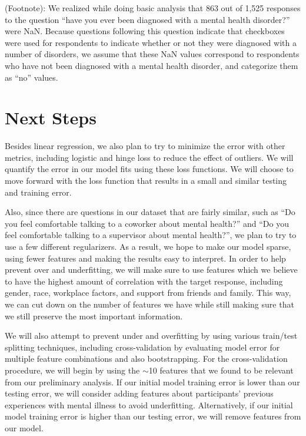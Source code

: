\documentclass[times, twocolumn]{article}
\begin{document}
(Footnote): We realized while doing basic analysis that 863 out of 1,525 responses 
to the question “have you ever been diagnosed with a mental health disorder?” 
were NaN. Because questions following this question indicate that checkboxes 
were used for respondents to indicate whether or not they were diagnosed with a 
number of disorders, we assume that these NaN values correspond to respondents 
who have not been diagnosed with a mental health disorder, and categorize them 
as “no” values. 


\section{Next Steps}
Besides linear regression, we also plan to try to minimize the error with other 
metrics, including logistic and hinge loss to reduce the effect of outliers. We 
will quantify the error in our model fits using these loss functions. We will 
choose to move forward with the loss function that results in a small and similar 
testing and training error. 

Also, since there are questions in our dataset that are fairly similar, such as 
“Do you feel comfortable talking to a coworker about mental health?” and 
“Do you feel comfortable talking to a supervisor about mental health?”, we plan 
to try to use a few different regularizers. As a result, we hope to make our model 
sparse, using fewer features and making the results easy to interpret. In order 
to help prevent over and underfitting, we will make sure to use features which 
we believe to have the highest amount of correlation with the target response, 
including gender, race, workplace factors, and support from friends and family. 
This way, we can cut down on the number of features we have while still making 
sure that we still preserve the most important information. 

We will also attempt to prevent under and overfitting by using various train/test 
splitting techniques, including cross-validation by evaluating model error for 
multiple feature combinations and also bootstrapping. For the cross-validation 
procedure, we will begin by using the $\sim$10 features that we found to be 
relevant from our preliminary analysis. If our initial model training error 
is lower than our testing error, we will consider adding features about 
participants’ previous experiences with mental illness to avoid underfitting. 
Alternatively, if our initial model training error is higher than our testing 
error, we will remove features from our model. 
\end{document}
